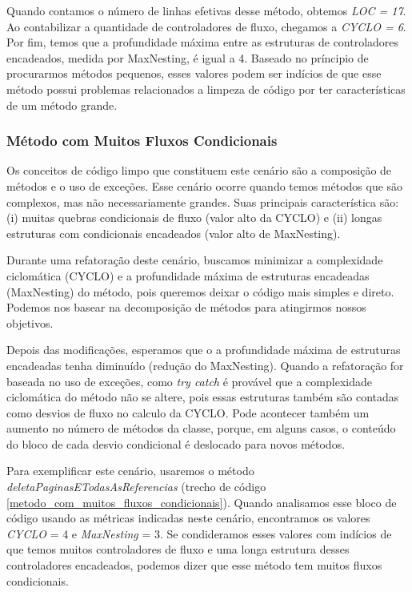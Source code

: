 Quando contamos o número de linhas efetivas desse método, obtemos \textit{LOC = 17}. Ao contabilizar a quantidade de controladores de fluxo, chegamos a \textit{CYCLO = 6}. Por fim, temos que a profundidade máxima entre as estruturas de controladores encadeados, medida por MaxNesting, é igual a 4. Baseado no príncipio de procurarmos métodos pequenos, esses valores podem ser indícios de que esse método possui problemas relacionados a limpeza de código por ter características de um método grande.

	
\subsubsection{Método com Muitos Fluxos Condicionais}
                  
Os conceitos de código limpo que constituem este cenário são a composição de métodos e o uso de exceções. Esse cenário ocorre quando temos métodos que são complexos, mas não necessariamente grandes. Suas principais característica são: (i) muitas quebras condicionais de fluxo (valor alto da CYCLO) e (ii) longas estruturas com condicionais encadeados (valor alto de MaxNesting).
                                                                                 
Durante uma refatoração deste cenário, buscamos minimizar a complexidade ciclomática (CYCLO) e a profundidade máxima de estruturas encadeadas (MaxNesting) do método, pois queremos deixar o código mais simples e direto. Podemos nos basear na decomposição de métodos para atingirmos nossos objetivos.
	
Depois das modificações, esperamos que o a profundidade máxima de estruturas encadeadas tenha diminuído (redução do MaxNesting). Quando a refatoração for baseada no uso de exceções, como \textit{try catch} é provável que a complexidade ciclomática do método não se altere, pois essas estruturas também são contadas como desvios de fluxo no calculo da CYCLO. Pode acontecer também um aumento no número de métodos da classe, porque, em alguns casos, o conteúdo do bloco de cada desvio condicional é deslocado para novos métodos. 
           
Para exemplificar este cenário, usaremos o método \textit{deletaPaginasETodasAsReferencias} (trecho de código \ref{metodo_com_muitos_fluxos_condicionais}). Quando analisamos esse bloco de código usando as métricas indicadas neste cenário, encontramos os valores \textit{CYCLO} = 4 e \textit{MaxNesting} = 3. Se condideramos esses valores com indícios de que temos muitos controladores de fluxo e uma longa estrutura desses controladores encadeados, podemos dizer que esse método tem muitos fluxos condicionais. 
                                                                                          
